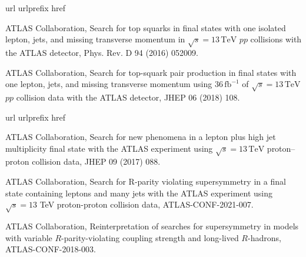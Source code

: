 \begin{thebibliography}{10}
\makeatletter
\renewcommand\@biblabel[1]{}
\makeatother
\expandafter\ifx\csname url\endcsname\relax
  \def\url#1{\texttt{#1}}\fi
\expandafter\ifx\csname urlprefix\endcsname\relax\def\urlprefix{URL }\fi
\expandafter\ifx\csname href\endcsname\relax
  \def\href#1#2{#2} \def\path#1{#1}\fi
  
{ATLAS Collaboration}, {Search for top squarks in final states with one
  isolated lepton, jets, and missing transverse momentum in \(\sqrt{s} =
  13\,\text{TeV}\) \(pp\) collisions with the ATLAS detector},
  \href {http://dx.doi.org/10.1103/PhysRevD.94.052009}
  {Phys. Rev. D 94 (2016) 052009}.


{ATLAS Collaboration}, {Search for top-squark pair production in final states
  with one lepton, jets, and missing transverse momentum using
  \(36\,\text{fb}^{-1}\) of \(\sqrt{s} = 13\,\text{TeV}\) \(pp\) collision data
  with the ATLAS detector}, 
  \href {http://dx.doi.org/10.1007/JHEP06(2018)108}
  {JHEP 06 (2018) 108}.
  
\end{thebibliography}

\begin{thebibliography}{10}
\makeatletter
\renewcommand\@biblabel[1]{}
\makeatother
\expandafter\ifx\csname url\endcsname\relax
  \def\url#1{\texttt{#1}}\fi
\expandafter\ifx\csname urlprefix\endcsname\relax\def\urlprefix{URL }\fi
\expandafter\ifx\csname href\endcsname\relax
  \def\href#1#2{#2} \def\path#1{#1}\fi

{ATLAS Collaboration}, {Search for new phenomena in a lepton plus high jet
  multiplicity final state with the ATLAS experiment using \(\sqrt{s} =
  13\,\text{TeV}\) proton--proton collision data}, 
  \href {http://dx.doi.org/10.1007/JHEP09(2017)088}
  {JHEP 09 (2017) 088}.

{ATLAS Collaboration}, {Search
  for R-parity violating supersymmetry in a final state containing leptons and
  many jets with the ATLAS experiment using $\sqrt{s}=13$ TeV proton-proton
  collision data}, \href{https://atlas.web.cern.ch/Atlas/GROUPS/PHYSICS/CONFNOTES/ATLAS-CONF-2021-007/}{ATLAS-CONF-2021-007}.

{ATLAS Collaboration}, {Reinterpretation of searches for
  supersymmetry in models with variable \(R\)-parity-violating coupling
  strength and long-lived \(R\)-hadrons}, 
  \href{https://cds.cern.ch/record/2308391}{ATLAS-CONF-2018-003}.  
\end{thebibliography}


